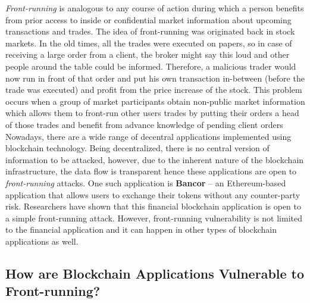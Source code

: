\emph{Front-running} is analogous to any course of action during which a person benefits from prior access to inside or confidential market information about upcoming transactions and trades.  The idea of front-running was originated back in stock markets. In the old times, all the trades were executed on papers, so in case of receiving a large order from a client, the broker might say this loud and other people around the table could be informed. Therefore, a malicious trader would now run in front of that order and put his own transaction in-between (before the trade was executed) and profit from the price increase of the stock. This problem occurs when a group of market participants obtain non-public market information which allows them to front-run other users trades by putting their orders a head of those trades and benefit from advance knowledge of pending client orders
Nowadays, there are a wide range of decentral applications implemented using blockchain technology. Being decentralized, there is no central version of information to be attacked, however, due to the inherent nature of the blockchain infrastructure, the data flow is transparent hence these applications are open to \emph{front-running} attacks. One such application is \textbf{Bancor} -- an Ethereum-based application that allows users to exchange their tokens without any counter-party risk. Researchers have shown that this financial blockchain application is open to a simple front-running attack.  However, front-running vulnerability is not limited to the financial application and it can happen in other types of blockchain applications as well. 



\subsection{How are Blockchain Applications Vulnerable to Front-running?} %
\label{sec:Front Running on the Blockchains}


